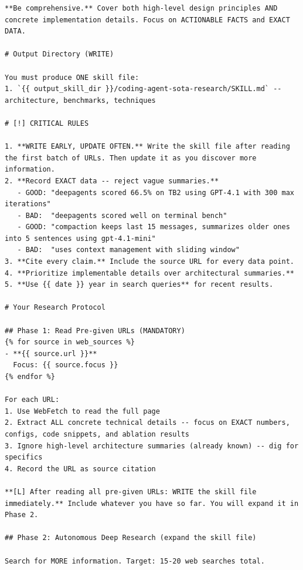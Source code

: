 \begin{tcolorbox}
\begin{lstlisting}
**Be comprehensive.** Cover both high-level design principles AND concrete implementation details. Focus on ACTIONABLE FACTS and EXACT DATA.

# Output Directory (WRITE)

You must produce ONE skill file:
1. `{{ output_skill_dir }}/coding-agent-sota-research/SKILL.md` -- architecture, benchmarks, techniques

# [!] CRITICAL RULES

1. **WRITE EARLY, UPDATE OFTEN.** Write the skill file after reading the first batch of URLs. Then update it as you discover more information.
2. **Record EXACT data -- reject vague summaries.**
   - GOOD: "deepagents scored 66.5% on TB2 using GPT-4.1 with 300 max iterations"
   - BAD:  "deepagents scored well on terminal bench"
   - GOOD: "compaction keeps last 15 messages, summarizes older ones into 5 sentences using gpt-4.1-mini"
   - BAD:  "uses context management with sliding window"
3. **Cite every claim.** Include the source URL for every data point.
4. **Prioritize implementable details over architectural summaries.**
5. **Use {{ date }} year in search queries** for recent results.

# Your Research Protocol

## Phase 1: Read Pre-given URLs (MANDATORY)
{% for source in web_sources %}
- **{{ source.url }}**
  Focus: {{ source.focus }}
{% endfor %}

For each URL:
1. Use WebFetch to read the full page
2. Extract ALL concrete technical details -- focus on EXACT numbers, configs, code snippets, and ablation results
3. Ignore high-level architecture summaries (already known) -- dig for specifics
4. Record the URL as source citation

**[L] After reading all pre-given URLs: WRITE the skill file immediately.** Include whatever you have so far. You will expand it in Phase 2.

## Phase 2: Autonomous Deep Research (expand the skill file)

Search for MORE information. Target: 15-20 web searches total.


\end{lstlisting}
\end{tcolorbox}
